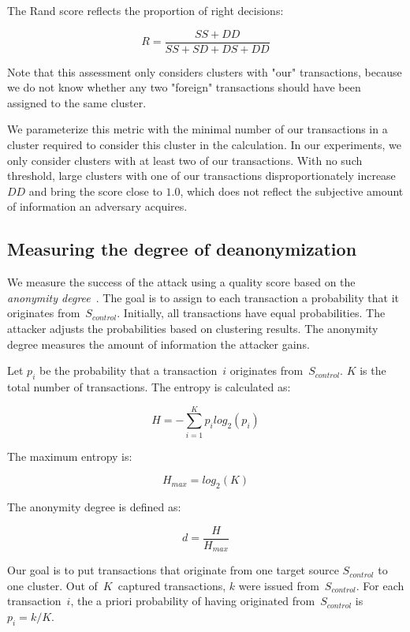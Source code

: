 The Rand score reflects the proportion of right decisions:

\[
R = \frac{SS + DD}{SS + SD + DS + DD}
\]

Note that this assessment only considers clusters with "our" transactions, because we do not know whether any two "foreign" transactions should have been assigned to the same cluster.

We parameterize this metric with the minimal number of our transactions in a cluster required to consider this cluster in the calculation.
In our experiments, we only consider clusters with at least two of our transactions.
With no such threshold, large clusters with one of our transactions disproportionately increase $DD$ and bring the score close to $1.0$, which does not reflect the subjective amount of information an adversary acquires.


\subsection{Measuring the degree of deanonymization}

We measure the success of the attack using a quality score based on the \textit{anonymity degree}~\cite{Diaz2002}.
The goal is to assign to each transaction a probability that it originates from~$S_{control}$.
Initially, all transactions have equal probabilities.
The attacker adjusts the probabilities based on clustering results.
The anonymity degree measures the amount of information the attacker gains.

Let $p_i$ be the probability that a transaction~$i$ originates from~$S_{control}$.
$K$ is the total number of transactions.
The entropy is calculated as:

\[
H = -\sum_{i=1}^K p_i log_2(p_i)
\]

The maximum entropy is:

\[
H_{max} = log_2(K)
\]

The anonymity degree is defined as:

\[
d = \frac{H}{H_{max}}
\]

Our goal is to put transactions that originate from one target source $S_{control}$ to one cluster.
Out of~$K$~captured transactions, $k$ were issued from~$S_{control}$.
For each transaction~$i$, the a priori probability of having originated from~$S_{control}$ is $p_i = k / K$.

